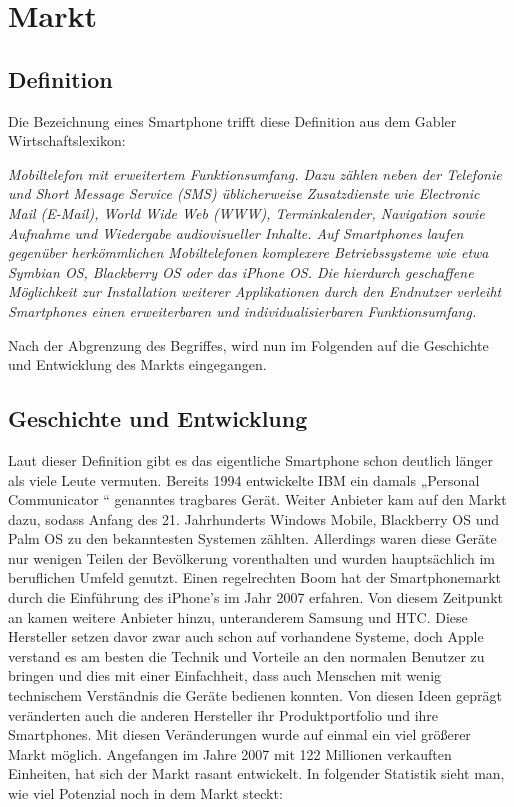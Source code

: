 
\chapter{Markt}

\section{Definition}

Die Bezeichnung eines Smartphone trifft diese Definition aus dem Gabler Wirtschaftslexikon:

\textit{Mobiltelefon mit erweitertem Funktionsumfang. Dazu zählen neben der Telefonie und Short Message Service (SMS) üblicherweise Zusatzdienste wie Electronic Mail (E-Mail), World Wide Web (WWW), Terminkalender, Navigation sowie Aufnahme und Wiedergabe audiovisueller Inhalte. Auf Smartphones laufen gegenüber herkömmlichen Mobiltelefonen komplexere Betriebssysteme wie etwa Symbian OS, Blackberry OS oder das iPhone OS. Die hierdurch geschaffene Möglichkeit zur Installation weiterer Applikationen durch den Endnutzer verleiht Smartphones einen erweiterbaren und individualisierbaren Funktionsumfang.}

Nach der Abgrenzung des Begriffes, wird nun im Folgenden auf die Geschichte und Entwicklung des Markts eingegangen.


\section{Geschichte und Entwicklung}

Laut dieser Definition gibt es das eigentliche Smartphone schon deutlich länger als viele Leute vermuten. Bereits 1994 entwickelte IBM ein damals „Personal Communicator “ genanntes tragbares Gerät. Weiter Anbieter kam auf den Markt dazu, sodass Anfang des 21. Jahrhunderts Windows Mobile, Blackberry OS und Palm OS zu den bekanntesten Systemen zählten. Allerdings waren diese Geräte nur wenigen Teilen der Bevölkerung vorenthalten  und wurden hauptsächlich im beruflichen Umfeld genutzt. Einen regelrechten Boom hat der Smartphonemarkt durch die Einführung des iPhone’s im Jahr 2007 erfahren. Von diesem Zeitpunkt an kamen weitere Anbieter hinzu, unteranderem Samsung und HTC. Diese Hersteller setzen davor zwar auch schon auf vorhandene Systeme, doch Apple verstand es am besten die Technik und Vorteile an den normalen Benutzer zu bringen und dies mit einer Einfachheit, dass auch Menschen mit wenig technischem Verständnis die Geräte bedienen konnten. Von diesen Ideen geprägt veränderten auch die anderen Hersteller ihr Produktportfolio und ihre Smartphones. Mit diesen Veränderungen wurde auf einmal ein viel größerer Markt möglich. Angefangen im Jahre 2007 mit 122 Millionen verkauften Einheiten, hat sich der Markt rasant entwickelt. In folgender Statistik sieht man, wie viel Potenzial noch in dem Markt steckt: 

